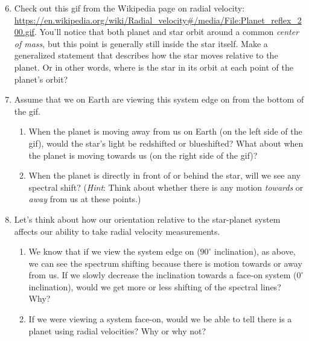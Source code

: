 \documentclass[11pt]{article}
\begin{document}
\begin{enumerate}
\setcounter{enumi}{5}
    \item Check out this gif from the Wikipedia page on radial velocity: \url{https://en.wikipedia.org/wiki/Radial_velocity#/media/File:Planet_reflex_200.gif}.  You'll notice that both planet and star orbit around a common \textit{center of mass}, but this point is generally still inside the star itself.  Make a generalized statement that describes how the star moves relative to the planet. Or in other words, where is the star in its orbit at each point of the planet's orbit?
        
    \item Assume that we on Earth are viewing this system edge on from the bottom of the gif.
        \begin{enumerate}
            \item When the planet is moving away from us on Earth (on the left side of the gif), would the star's light be redshifted or blueshifted? What about when the planet is moving towards us (on the right side of the gif)?
            
            \item When the planet is directly in front of or behind the star, will we see any spectral shift? (\textit{Hint}: Think about whether there is any motion \textit{towards} or \textit{away} from us at these points.)
        \end{enumerate}
        
    \item Let's think about how our orientation relative to the star-planet system affects our ability to take radial velocity measurements.
        \begin{enumerate}
            \item We know that if we view the system edge on ($90^\circ$ inclination), as above, we can see the spectrum shifting because there is motion towards or away from us.  If we slowly decrease the inclination towards a face-on system ($0^\circ$ inclination), would we get more or less shifting of the spectral lines? Why?
            
            \item If we were viewing a system face-on, would we be able to tell there is a planet using radial velocities? Why or why not?
        \end{enumerate}
        

\end{enumerate}
\end{document}
